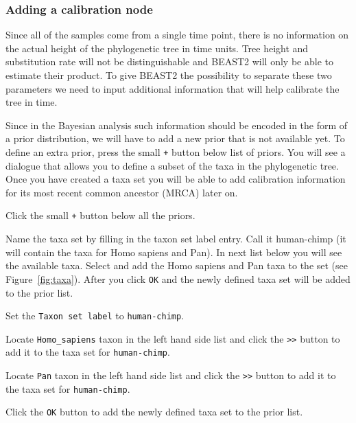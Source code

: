 \documentclass[11pt]{article}
\begin{document}
\subsubsection{Adding a calibration node}

Since all of the samples come from a single time point, there is no information on the actual height of the phylogenetic tree in time units. Tree height and substitution rate will not be distinguishable and BEAST2 will only be able to estimate their product. To give BEAST2 the possibility to separate these two parameters we need to input additional information that will help calibrate the tree in time.

Since in the Bayesian analysis such information should be encoded in the form of a prior distribution, we will have to add a new prior that is not available yet. To define an extra prior, press the small \texttt{+} button below list of priors. You will see a dialogue that allows you to define a subset of the taxa in the phylogenetic tree. Once you have created a taxa set you will be able to add calibration information for its most recent common ancestor (MRCA) later on.

\begin{framed}
Click the small \texttt{+} button below all the priors.
\end{framed}

Name the taxa set by filling in the taxon set label entry. Call it human-chimp (it will contain the taxa for Homo sapiens and Pan). In next list below you will see the available taxa. Select and add the Homo sapiens and Pan taxa to the set (see Figure~\ref{fig:taxa}). After you click \texttt{OK} and the newly defined taxa set will be added to the prior list.

\begin{framed}
Set the \texttt{Taxon set label} to \texttt{human-chimp}.

Locate \texttt{Homo\_sapiens} taxon in the left hand side list and click the \texttt{>>} button to add it to the taxa set for \texttt{human-chimp}.

Locate \texttt{Pan} taxon in the left hand side list and click the \texttt{>>} button to add it to the taxa set for \texttt{human-chimp}.

Click the \texttt{OK} button to add the newly defined taxa set to the prior list.
\end{framed}
\end{document}
